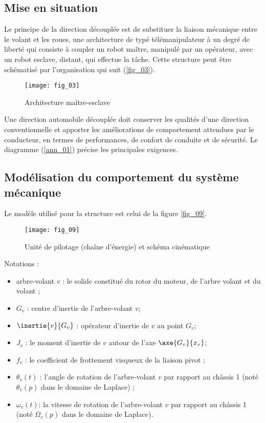 \ifprof
\else
\begin{multicols}{2}
\fi

\setcounter{numques}{0}

\subsection*{Mise en situation}

Le principe de la direction découplée est de substituer la liaison mécanique entre le volant et les roues, une architecture de typé télémanipulateur à un degré de liberté qui consiste à coupler un robot maître, manipulé par un opérateur, avec un robot esclave, distant, qui effectue la tâche. Cette structure peut être schématisé par l'organisation qui suit (\autoref{fig_03}).

\begin{figure}[H]
\centering
\texttt{[image: fig\_03]}

\caption{Architecture maître-esclave \label{fig_03}}
\end{figure}



Une direction automobile découplée doit conserver les qualités d'une direction conventionnelle et
apporter les améliorations de comportement attendues par le conducteur, en termes de performances,
de confort de conduite et de sécurité. Le diagramme (\autoref{ann_01}) précise les principales
exigences.

\subsection*{Modélisation du comportement du système mécanique}

Le modèle utilisé pour la structure est celui de la figure \autoref{fig_09}.

\begin{figure}[H]
\centering
\texttt{[image: fig\_09]}

\caption{Unité de pilotage (chaîne d'énergie) et schéma cinématique  \label{fig_09}}
\end{figure}

Notations :
\begin{itemize}
\item arbre-volant $v$ : le solide constitué du rotor du moteur, de l'arbre volant et du volant ;
\item $G_v$ : centre d'inertie de l'arbre-volant $v$;
\item $\inertie{v}{G_v}$ : opérateur d'inertie de $v$ au point $G_v$;
\item $J_v$ : le moment d'inertie de $v$ autour de l'axe $\axe{G_v}{x_v}$;
\item $f_v$ : le coefficient de frottement visqueux de la liaison pivot ;
\item $\theta_v(t)$ : l'angle de rotation de l'arbre-volant $v$ par rapport au châssis 1 (noté $\theta_v(p)$ dans le
domaine de Laplace) ;
\item $\omega_v(t) $: la vitesse de rotation de l'arbre-volant $v$ par rapport au châssis 1 (noté $\Omega_v(p)$ dans le domaine de Laplace).
\end{itemize}


\end{multicols}
